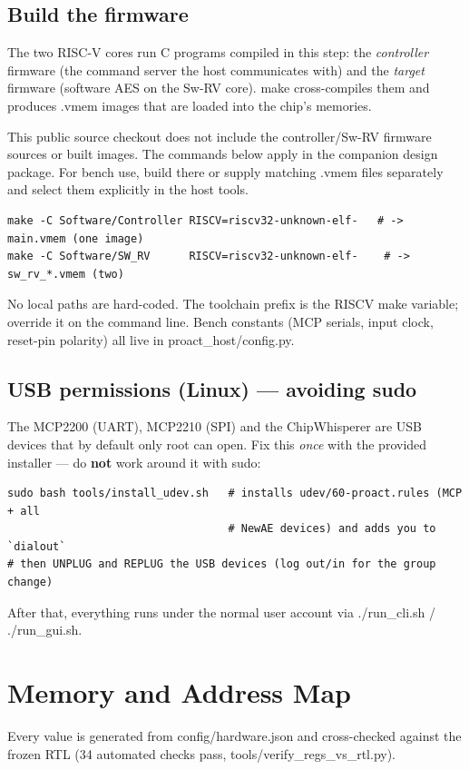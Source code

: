 \documentclass[11pt,a4paper]{report}
\newcommand{\code}[1]{{\ttfamily\small #1}}
\begin{document}
\section{Build the firmware}
The two RISC-V cores run C programs compiled in this step: the
\emph{controller} firmware (the command server the host communicates with) and the
\emph{target} firmware (software AES on the Sw-RV core). \code{make} cross-compiles
them and produces \code{.vmem} images that are loaded into the chip's memories.
\begin{notebox}
This public source checkout does not include the controller/Sw-RV firmware
sources or built images. The commands below apply in the companion design
package. For bench use, build there or supply matching \code{.vmem} files
separately and select them explicitly in the host tools.
\end{notebox}
\begin{lstlisting}[style=sh]
make -C Software/Controller RISCV=riscv32-unknown-elf-   # -> main.vmem (one image)
make -C Software/SW_RV      RISCV=riscv32-unknown-elf-    # -> sw_rv_*.vmem (two)
\end{lstlisting}
\begin{tipbox}
No local paths are hard-coded. The toolchain prefix is the \code{RISCV} make
variable; override it on the command line. Bench constants (MCP serials, input
clock, reset-pin polarity) all live in \code{proact\_host/config.py}.
\end{tipbox}

\section{USB permissions (Linux) --- avoiding \code{sudo}}
The MCP2200 (UART), MCP2210 (SPI) and the ChipWhisperer are USB devices that by
default only root can open. Fix this \emph{once} with the provided installer ---
do \textbf{not} work around it with \code{sudo}:
\begin{lstlisting}[style=sh]
sudo bash tools/install_udev.sh   # installs udev/60-proact.rules (MCP + all
                                  # NewAE devices) and adds you to `dialout`
# then UNPLUG and REPLUG the USB devices (log out/in for the group change)
\end{lstlisting}
After that, everything runs under the normal user account via \code{./run\_cli.sh} /
\code{./run\_gui.sh}.

\chapter{Memory and Address Map}
Every value is generated from \code{config/hardware.json} and cross-checked
against the frozen RTL (34 automated checks pass, \code{tools/verify\_regs\_vs\_rtl.py}).
\end{document}
